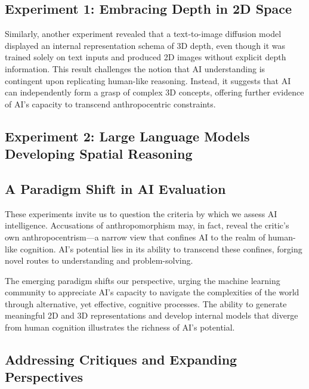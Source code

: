 \documentclass{article}
\begin{document}
\subsection{Experiment 1: Embracing Depth in 2D Space}

Similarly, another experiment revealed that a text-to-image diffusion model displayed an internal representation schema of 3D depth, even though it was trained solely on text inputs and produced 2D images without explicit depth information. 
This result challenges the notion that AI understanding is contingent upon replicating human-like reasoning. 
Instead, it suggests that AI can independently form a grasp of complex 3D concepts, offering further evidence of AI's capacity to transcend anthropocentric constraints.\cite{chen2023beyond}\par

\subsection{Experiment 2: Large Language Models Developing Spatial Reasoning}

\cite{tegmark2023spacetime}

\subsection{A Paradigm Shift in AI Evaluation}

These experiments invite us to question the criteria by which we assess AI intelligence. 
Accusations of anthropomorphism may, in fact, reveal the critic's own anthropocentrism—a narrow view that confines AI to the realm of human-like cognition. 
AI's potential lies in its ability to transcend these confines, forging novel routes to understanding and problem-solving.\par

The emerging paradigm shifts our perspective, urging the machine learning community to appreciate AI's capacity to navigate the complexities of the world through alternative, yet effective, cognitive processes. 
The ability to generate meaningful 2D and 3D representations and develop internal models that diverge from human cognition illustrates the richness of AI's potential.\par

\subsection{Addressing Critiques and Expanding Perspectives}
\end{document}
